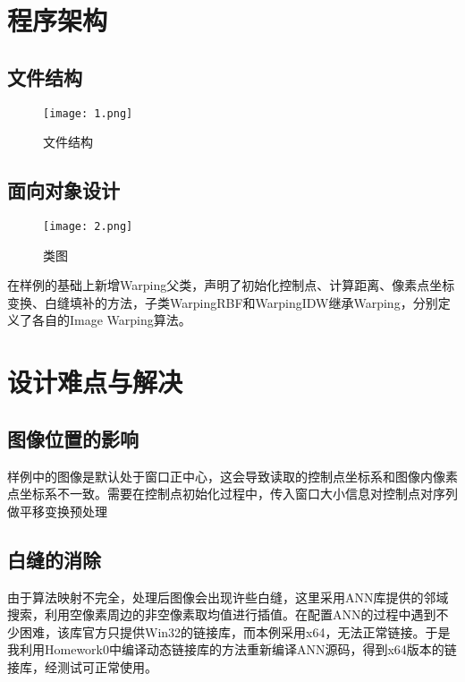 \documentclass[14pt]{scrartcl} %
\begin{document}
\pagebreak
\section{程序架构}
\subsection{文件结构}
\begin{figure}[h] %
	\centering
	\texttt{[image: 1.png]} %
	\caption{文件结构}
\end{figure}


\pagebreak
\subsection{面向对象设计}

\begin{figure}[h] %
	\centering
	\texttt{[image: 2.png]} %
	\caption{类图}
\end{figure}

在样例的基础上新增Warping父类，声明了初始化控制点、计算距离、像素点坐标变换、白缝填补的方法，子类WarpingRBF和WarpingIDW继承Warping，分别定义了各自的Image Warping算法。

\pagebreak
\section{设计难点与解决}

\subsection{图像位置的影响}

样例中的图像是默认处于窗口正中心，这会导致读取的控制点坐标系和图像内像素点坐标系不一致。需要在控制点初始化过程中，传入窗口大小信息对控制点对序列做平移变换预处理

\subsection{白缝的消除}

由于算法映射不完全，处理后图像会出现许些白缝，这里采用ANN库提供的邻域搜索，利用空像素周边的非空像素取均值进行插值。在配置ANN的过程中遇到不少困难，该库官方只提供Win32的链接库，而本例采用x64，无法正常链接。于是我利用Homework0中编译动态链接库的方法重新编译ANN源码，得到x64版本的链接库，经测试可正常使用。
\end{document}
